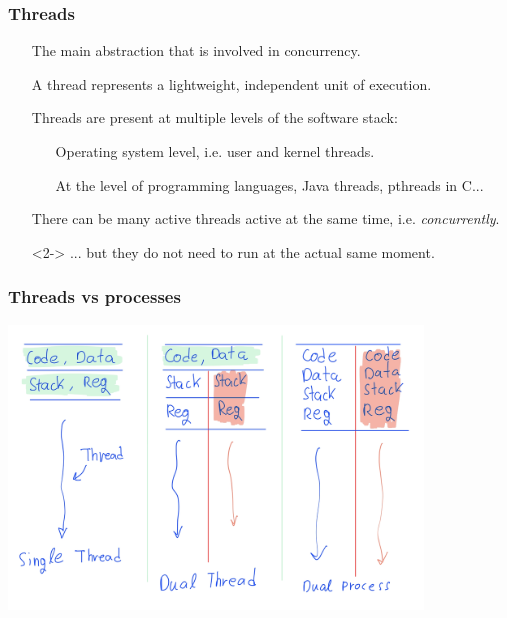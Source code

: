 \documentclass[xcolor={dvipsnames,svgnames},aspectratio=169]{beamer}
\begin{document}
\begin{frame}[fragile]
  \frametitle{Threads}

  \begin{itemize}
  \item[\faBook] The main abstraction that is involved in concurrency.
  \item[\faBook] A thread represents a lightweight, independent unit of
    execution.
  \item[\faBook] Threads are present at multiple levels of the
    software stack:
    \begin{itemize}
    \item[\faLinux] Operating system level, i.e. user and kernel threads.
    \item[\faCode] At the level of programming languages, Java threads, pthreads
      in C...
    \end{itemize}
  \item[\faBook] There can be many active threads active at the same time, i.e.
    \emph{concurrently}.
  \item[\faExclamation]<2-> ... but they do not need to run at the actual same moment.
  \end{itemize}
\end{frame}

\begin{frame}[fragile]
  \frametitle{Threads vs processes}

  \begin{center}
    \includegraphics[width=11cm,keepaspectratio]{../media/lecture1-threads.png}
  \end{center}

\end{frame}
\end{document}
